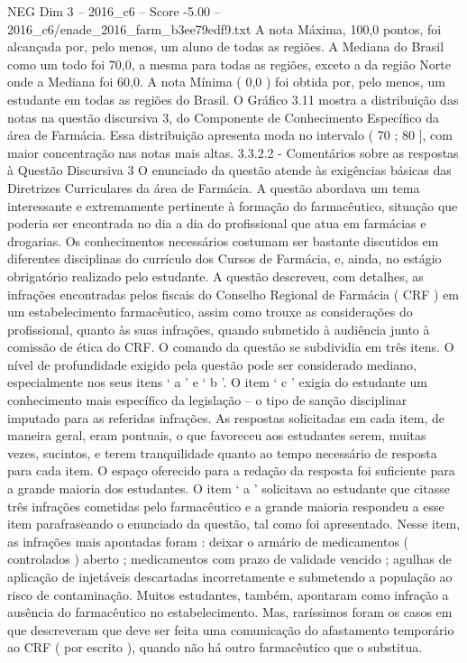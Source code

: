 \begin{textsample}{NEG Dim 3 – 2016\_c6 – Score -5.00 – 2016\_c6/enade\_2016\_farm\_b3ee79edf9.txt}
A nota Máxima, 100,0 pontos, foi alcançada por, pelo menos, um aluno de todas as regiões.
A Mediana do Brasil como um todo foi 70,0, a mesma para todas as regiões, exceto a da região Norte onde a Mediana foi 60,0.
A nota Mínima ( 0,0 ) foi obtida por, pelo menos, um estudante em todas as regiões do Brasil.
O Gráfico 3.11 mostra a distribuição das notas na questão discursiva 3, do Componente de Conhecimento Específico da área de Farmácia.
Essa distribuição apresenta moda no intervalo ( 70 ; 80 ], com maior concentração nas notas mais altas. 3.3.2.2 - Comentários sobre as respostas à Questão Discursiva 3 O enunciado da questão atende às exigências básicas das Diretrizes Curriculares da área de Farmácia.
A questão abordava um tema interessante e extremamente pertinente à formação do farmacêutico, situação que poderia ser encontrada no dia a dia do profissional que atua em farmácias e drogarias.
Os conhecimentos necessários costumam ser bastante discutidos em diferentes disciplinas do currículo dos Cursos de Farmácia, e, ainda, no estágio obrigatório realizado pelo estudante.
A questão descreveu, com detalhes, as infrações encontradas pelos fiscais do Conselho Regional de Farmácia ( CRF ) em um estabelecimento farmacêutico, assim como trouxe as considerações do profissional, quanto às suas infrações, quando submetido à audiência junto à comissão de ética do CRF.
O comando da questão se subdividia em três itens.
O nível de profundidade exigido pela questão pode ser considerado mediano, especialmente nos seus itens ‘ a ’ e ‘ b ’.
O item ‘ c ’ exigia do estudante um conhecimento mais específico da legislação – o tipo de sanção disciplinar imputado para as referidas infrações.
As respostas solicitadas em cada item, de maneira geral, eram pontuais, o que favoreceu aos estudantes serem, muitas vezes, sucintos, e terem tranquilidade quanto ao tempo necessário de resposta para cada item.
O espaço oferecido para a redação da resposta foi suficiente para a grande maioria dos estudantes.
O item ‘ a ’ solicitava ao estudante que citasse três infrações cometidas pelo farmacêutico e a grande maioria respondeu a esse item parafraseando o enunciado da questão, tal como foi apresentado.
Nesse item, as infrações mais apontadas foram : deixar o armário de medicamentos ( controlados ) aberto ; medicamentos com prazo de validade vencido ; agulhas de aplicação de injetáveis descartadas incorretamente e submetendo a população ao risco de contaminação.
Muitos estudantes, também, apontaram como infração a ausência do farmacêutico no estabelecimento.
Mas, raríssimos foram os casos em que descreveram que deve ser feita uma comunicação do afastamento temporário ao CRF ( por escrito ), quando não há outro farmacêutico que o substitua.

\end{textsample}
